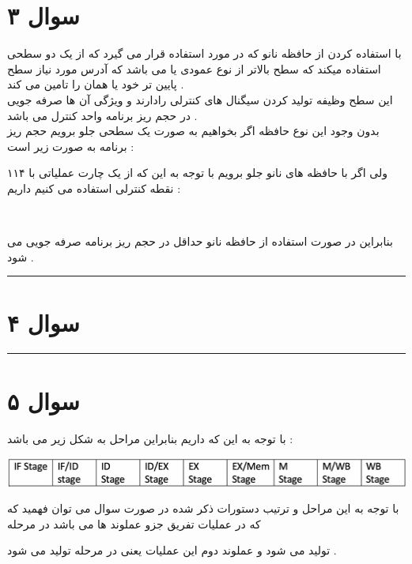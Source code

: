 \documentclass{article}
\begin{document}
\section*{سوال ۳ }
با استفاده کردن از حافظه نانو که در 
مورد استفاده قرار می گیرد که از یک 
دو سطحی استفاده میکند که سطح بالاتر
 از نوع عمودی یا 
می باشد که آدرس مورد نیاز سطح پایین تر خود یا همان 
را تامین می کند . \\
این سطح وظیفه تولید کردن سیگنال های کنترلی رادارند و ویژگی آن ها صرفه جویی در حجم ریز برنامه واحد کنترل می باشد  . \\
بدون وجود این نوع حافظه اگر بخواهیم به صورت یک سطحی 
جلو برویم حجم ریز برنامه به صورت زیر است :‌ 
\begin{center}
\end{center}
ولی اگر با حافظه های نانو جلو برویم با توجه به این که  از یک چارت عملیاتی با ۱۱۴ نقطه کنترلی  استفاده می کنیم داریم  : 
\begin{center}
	\\
\end{center}
بنابراین در صورت استفاده از حافظه نانو حداقل 
\textcolor{red}{  }
در حجم ریز برنامه صرفه جویی می شود  . 
\hrule
\section*{سوال ۴}
\hrule
\section*{سوال ۵ }
با توجه به این که 
داریم بنابراین مراحل به شکل زیر می باشد   : 
\begin{center}
	\includegraphics[width=1\textwidth]{q5p1}
\end{center}
با توجه به این مراحل و ترتیب دستورات ذکر شده در صورت سوال می توان فهمید که 
که در عملیات تفریق جزو عملوند ها می باشد در مرحله 
\textcolor{red}{}

تولید می شود  و عملوند دوم این عملیات یعنی 
در مرحله 
\textcolor{red}{}
تولید می شود  . 
\end{document}
